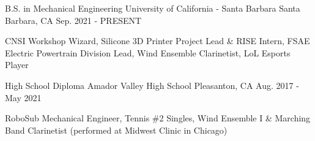 


\begin{cventries}

\cventry
{B.S. in Mechanical Engineering} %
{University of California - Santa Barbara} %
{Santa Barbara, CA} %
{Sep. 2021 - PRESENT} %
{ %
\begin{cvitems}
\item {CNSI Workshop Wizard, Silicone 3D Printer Project Lead \& RISE Intern, FSAE Electric Powertrain Division Lead, Wind Ensemble Clarinetist, LoL Esports Player}
\end{cvitems}
}

\cventry
{High School Diploma} %
{Amador Valley High School} %
{Pleasanton, CA} %
{Aug. 2017 - May 2021} %
{ %
\begin{cvitems}
\item{RoboSub Mechanical Engineer, Tennis \#2 Singles, Wind Ensemble I \& Marching Band Clarinetist (performed at Midwest Clinic in Chicago)}
\end{cvitems}
}




\end{cventries}